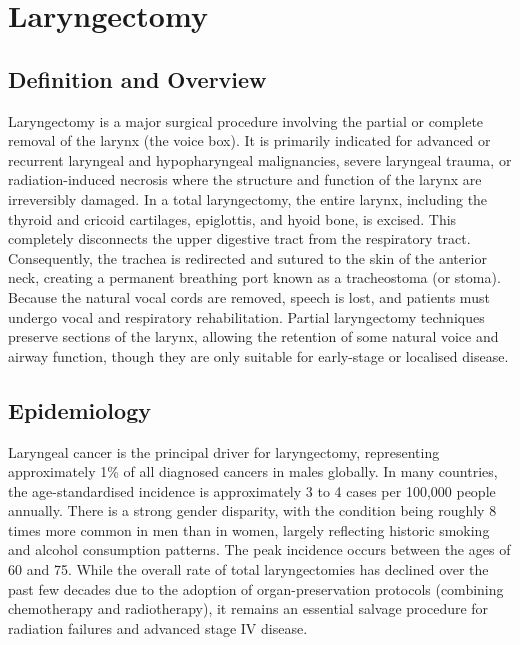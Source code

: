 \chapter{Laryngectomy}

\section*{Definition and Overview}
Laryngectomy is a major surgical procedure involving the partial or complete removal of the larynx (the voice box). It is primarily indicated for advanced or recurrent laryngeal and hypopharyngeal malignancies, severe laryngeal trauma, or radiation-induced necrosis where the structure and function of the larynx are irreversibly damaged. In a total laryngectomy, the entire larynx, including the thyroid and cricoid cartilages, epiglottis, and hyoid bone, is excised. This completely disconnects the upper digestive tract from the respiratory tract. Consequently, the trachea is redirected and sutured to the skin of the anterior neck, creating a permanent breathing port known as a tracheostoma (or stoma). Because the natural vocal cords are removed, speech is lost, and patients must undergo vocal and respiratory rehabilitation. Partial laryngectomy techniques preserve sections of the larynx, allowing the retention of some natural voice and airway function, though they are only suitable for early-stage or localised disease.

\section*{Epidemiology}
Laryngeal cancer is the principal driver for laryngectomy, representing approximately 1\% of all diagnosed cancers in males globally. In many countries, the age-standardised incidence is approximately 3 to 4 cases per 100,000 people annually. There is a strong gender disparity, with the condition being roughly 8 times more common in men than in women, largely reflecting historic smoking and alcohol consumption patterns. The peak incidence occurs between the ages of 60 and 75. While the overall rate of total laryngectomies has declined over the past few decades due to the adoption of organ-preservation protocols (combining chemotherapy and radiotherapy), it remains an essential salvage procedure for radiation failures and advanced stage IV disease.


